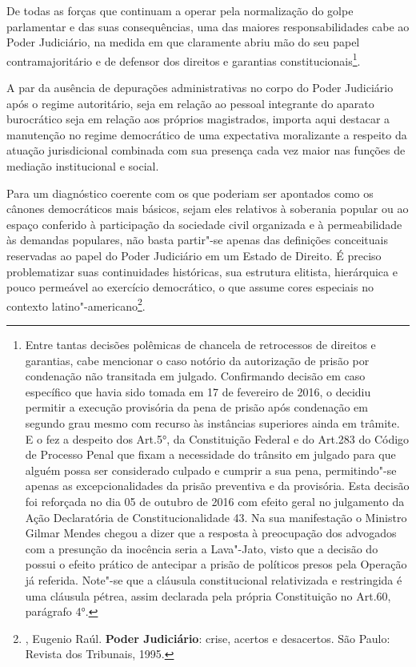 De todas as forças que continuam a operar pela normalização do golpe
parlamentar e das suas consequências, uma das maiores responsabilidades
cabe ao Poder Judiciário, na medida em que claramente abriu mão do seu
papel contramajoritário e de defensor dos direitos e garantias
constitucionais\footnote{Entre tantas decisões polêmicas de chancela de
  retrocessos de direitos e garantias, cabe mencionar o caso notório da
  autorização de prisão por condenação não transitada em julgado.
  Confirmando decisão em caso específico que havia sido tomada em 17 de
  fevereiro de 2016, o  decidiu permitir a execução provisória da
  pena de prisão após condenação em segundo grau mesmo com recurso às
  instâncias superiores ainda em trâmite. E o fez a despeito dos Art.5°,
   da Constituição Federal e do Art.283 do Código de Processo Penal
  que fixam a necessidade do trânsito em julgado para que alguém possa
  ser considerado culpado e cumprir a sua pena, permitindo"-se apenas as
  excepcionalidades da prisão preventiva e da provisória. Esta decisão
  foi reforçada no dia 05 de outubro de 2016 com efeito geral no
  julgamento da Ação Declaratória de Constitucionalidade 43. Na sua
  manifestação o Ministro Gilmar Mendes chegou a dizer que a resposta à
  preocupação dos advogados com a presunção da inocência seria a
  Lava"-Jato, visto que a decisão do  possui o efeito prático de
  antecipar a prisão de políticos presos pela Operação já referida.
  Note"-se que a cláusula constitucional relativizada e restringida é uma
  cláusula pétrea, assim declarada pela própria Constituição no Art.60,
  parágrafo 4°.}.

A par da ausência de depurações administrativas no corpo do Poder
Judiciário após o regime autoritário, seja em relação ao pessoal
integrante do aparato burocrático seja em relação aos próprios
magistrados, importa aqui destacar a manutenção no regime democrático de
uma expectativa moralizante a respeito da atuação jurisdicional
combinada com sua presença cada vez maior nas funções de mediação
institucional e social.

Para um diagnóstico coerente com os que poderiam ser apontados como os
cânones democráticos mais básicos, sejam eles relativos à soberania
popular ou ao espaço conferido à participação da sociedade civil
organizada e à permeabilidade às demandas populares, não basta partir"-se
apenas das definições conceituais reservadas ao papel do Poder
Judiciário em um Estado de Direito. É preciso problematizar suas
continuidades históricas, sua estrutura elitista, hierárquica e pouco
permeável ao exercício democrático, o que assume cores especiais no
contexto latino"-americano\footnote{, Eugenio Raúl.
  \textbf{Poder Judiciário}: crise, acertos e desacertos. São Paulo:
  Revista dos Tribunais, 1995.}.

